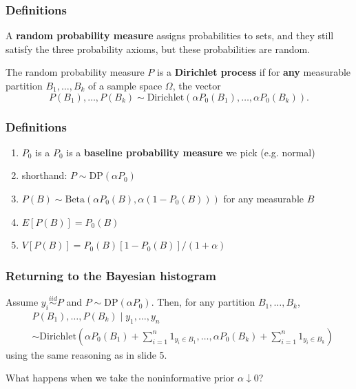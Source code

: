 \documentclass{beamer}
\begin{document}
\begin{frame}
\frametitle{Definitions}

A {\bf random probability measure} assigns probabilities to sets, and they still satisfy the three probability axioms, but these probabilities are random. 
\newline
\pause

The random probability measure $P$ is a {\bf Dirichlet process} if for {\bf any} measurable partition $B_1, \ldots, B_k$ of a sample space $\Omega$, the vector
$$
P(B_1), \ldots, P(B_k) \sim \text{Dirichlet}(\alpha P_0(B_1), \ldots, \alpha P_0(B_k)).
$$


\end{frame}
\begin{frame}
\frametitle{Definitions}


\begin{enumerate}
\item $P_0$ is a $P_0$ is a {\bf baseline probability measure} we pick (e.g. normal)
\item shorthand: $P \sim \text{DP}(\alpha P_0)$
\item $P(B) \sim \text{Beta}(\alpha P_0(B), \alpha(1-P_0(B)))$ for any measurable $B$
\item $E[P(B)] = P_0(B)$
\item $V[P(B)] = P_0(B)[1-P_0(B)]/(1+\alpha)$
\end{enumerate}

\end{frame}

\begin{frame}
\frametitle{Returning to the Bayesian histogram}

Assume $y_i \overset{iid}{\sim} P$ and $P \sim \text{DP}(\alpha P_0)$. Then, for any partition $B_1, \ldots, B_k$,  
\begin{align*}
&P(B_1), \ldots, P(B_k) \mid y_1, \ldots, y_n \\
&\sim \text{Dirichlet}\left(\alpha P_0(B_1) + \sum_{i=1}^n 1_{y_i \in B_1}, \ldots, \alpha P_0(B_k) + \sum_{i=1}^n 1_{y_i \in B_k} \right)
\end{align*}
using the same reasoning as in slide 5.
\newline
\pause

What happens when we take the noninformative prior $\alpha \downarrow 0$?

\end{frame}
\end{document}
